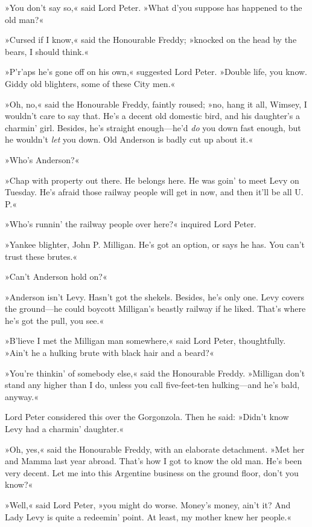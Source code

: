 »You don't say so,« said Lord Peter. »What d'you suppose has happened to the old man?«

»Cursed if I know,« said the Honourable Freddy; »knocked on the head by the bears, I should think.«

»P'r'aps he's gone off on his own,« suggested Lord Peter. »Double life, you know. Giddy old blighters, some of these City men.«

»Oh, no,« said the Honourable Freddy, faintly roused; »no, hang it all, Wimsey, I wouldn't care to say that. He's a decent old domestic bird, and his daughter's a charmin' girl. Besides, he's straight enough\allowbreak---\allowbreak he'd \textit{do} you down fast enough, but he wouldn't \textit{let} you down. Old Anderson is badly cut up about it.«

»Who's Anderson?«

»Chap with property out there. He belongs here. He was goin' to meet Levy on Tuesday. He's afraid those railway people will get in now, and then it'll be all U. P.«

»Who's runnin' the railway people over here?« inquired Lord Peter.

»Yankee blighter, John P. Milligan. He's got an option, or says he has. You can't trust these brutes.«

»Can't Anderson hold on?«

»Anderson isn't Levy. Hasn't got the shekels. Besides, he's only one. Levy covers the ground\allowbreak---\allowbreak he could boycott Milligan's beastly railway if he liked. That's where he's got the pull, you see.«

»B'lieve I met the Milligan man somewhere,« said Lord Peter, thoughtfully. »Ain't he a hulking brute with black hair and a beard?«

»You're thinkin' of somebody else,« said the Honourable Freddy. »Milligan don't stand any higher than I do, unless you call five-feet-ten hulking\allowbreak---\allowbreak and he's bald, anyway.«

Lord Peter considered this over the Gorgonzola. Then he said: »Didn't know Levy had a charmin' daughter.«

»Oh, yes,« said the Honourable Freddy, with an elaborate detachment. »Met her and Mamma last year abroad. That's how I got to know the old man. He's been very decent. Let me into this Argentine business on the ground floor, don't you know?«

»Well,« said Lord Peter, »you might do worse. Money's money, ain't it? And Lady Levy is quite a redeemin' point. At least, my mother knew her people.«

